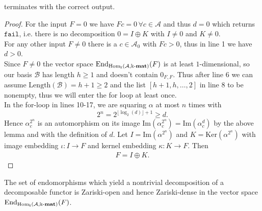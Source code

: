 \begin{proposition}\label{prop:Decompose_terminates_correct}
 terminates with the correct output.
\end{proposition}
\begin{proof}
For the input $F = 0$ we have $Fc = 0\,\forall c \in \mathcal{A}$ and thus $d = 0$ which returns $\mathtt{fail}$, i.e. there is no
decomposition $0 = I \oplus K$ with $I \neq 0$ and $K \neq 0$.\\

\noindent For any other input $F \neq 0$ there is a $c \in \mathcal{A}_{0}$ with $Fc > 0$, thus in line 1 we have $d > 0$.\\
Since $F \neq 0$ the vector space $\mathrm{End}_{\mathrm{Hom_{\Bbbk}}(\mathcal{A},\Bbbk\textnormal{-}\mathbf{mat})}(F)$ is at least $1$-dimensional, so our basis $\mathcal{B}$ has
length $h \geq 1$ and doesn't contain $0_{F,F}$. Thus after line 6 we can assume $\mathrm{Length}(\mathcal{B}) = h+1 \geq 2$ and
the list $[h+1,h,\dots,2]$ in line 8 to be nonempty, thus we will enter the for loop at least once.\\

\noindent In the for-loop in lines 10-17, we are squaring $\alpha$ at most $n$ times with
\[
2^{n} = 2^{\lfloor\log_{2}(d)\rfloor+1} \geq d.
\]
Hence $\alpha_{c}^{2^{n}}$ is an automorphism on its image $\mathrm{Im}(\alpha_{c}^{2^{n}}) = \mathrm{Im}(\alpha_{c}^{d})$
by the above lemma and with the definition of $d$. Let $I = \mathrm{Im}(\alpha^{2^{n}})$ and $K = \mathrm{Ker}(\alpha^{2^{n}})$
with image embedding $\iota : I \rightarrow F$ and kernel embedding $\kappa : K \rightarrow F$. Then 
\begin{align}
F = I \oplus K.
\end{align}
\end{proof}

\begin{remark}
The set of endomorphisms which yield a nontrivial decomposition of a decomposable functor is Zariski-open and hence Zariski-dense in
the vector space $\mathrm{End}_{\mathrm{Hom_{\Bbbk}}(\mathcal{A},\Bbbk\textnormal{-}\mathbf{mat})}(F)$.
\end{remark}

